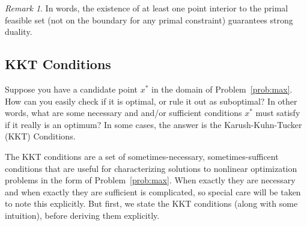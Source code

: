 \documentclass[12pt]{book}
\numberwithin{equation}{section} %
\theoremstyle{plain}
\theoremstyle{definition}
\theoremstyle{remark}
\newtheorem*{rmk}{Remark}
\begin{document}
\begin{rmk}
In words, the existence of at least one point interior to the primal
feasible set (not on the boundary for any primal constraint) guarantees
strong duality.
\end{rmk}


\clearpage
\subsection{KKT Conditions}

Suppose you have a candidate point $x^*$ in the domain of
Problem~\ref{prob:max}.  How can you easily check if it is optimal, or
rule it out as suboptimal? In other words, what are some necessary and
and/or sufficient conditions $x^*$ must satisfy if it really is
an optimum?  In some cases, the answer is the Karush-Kuhn-Tucker (KKT)
Conditions.

The KKT conditions are a set of sometimes-necessary, sometimes-sufficent
conditions that are useful for characterizing solutions to nonlinear
optimization problems in the form of Problem~\ref{prob:max}. When
exactly they are necessary and when exactly they are sufficient is
complicated, so special care will be taken to note this explicitly.
But first, we state the KKT conditions (along with some intuition),
before deriving them explicitly.


\end{document}
